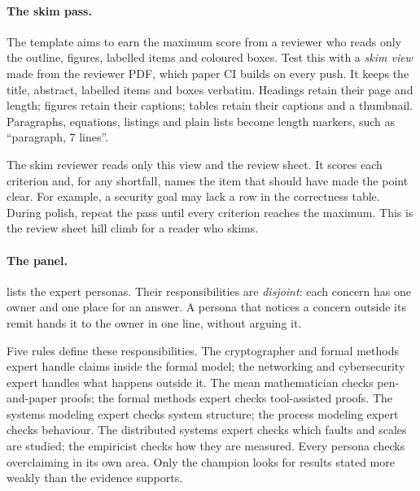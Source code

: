 \paragraph{The skim pass.} The template aims to earn the maximum score from a reviewer who reads only the outline, figures, labelled items and coloured boxes. Test this with a \emph{skim view} made from the reviewer PDF, which paper CI builds on every push. It keeps the title, abstract, labelled items and boxes verbatim. Headings retain their page and length; figures retain their captions; tables retain their captions and a thumbnail. Paragraphs, equations, listings and plain lists become length markers, such as \enquote{paragraph, 7 lines}.

The skim reviewer reads only this view and the review sheet. It scores each criterion and, for any shortfall, names the item that should have made the point clear. For example, a security goal may lack a row in the correctness table. During polish, repeat the pass until every criterion reaches the maximum. This is the review sheet hill climb for a reader who skims.

\paragraph{The panel.}  lists the expert personas. Their responsibilities are \emph{disjoint}: each concern has one owner and one place for an answer. A persona that notices a concern outside its remit hands it to the owner in one line, without arguing it.

Five rules define these responsibilities. The cryptographer and formal methods expert handle claims inside the formal model; the networking and cybersecurity expert handles what happens outside it. The mean mathematician checks pen-and-paper proofs; the formal methods expert checks tool-assisted proofs. The systems modeling expert checks system structure; the process modeling expert checks behaviour. The distributed systems expert checks which faults and scales are studied; the empiricist checks how they are measured. Every persona checks overclaiming in its own area. Only the champion looks for results stated more weakly than the evidence supports.

